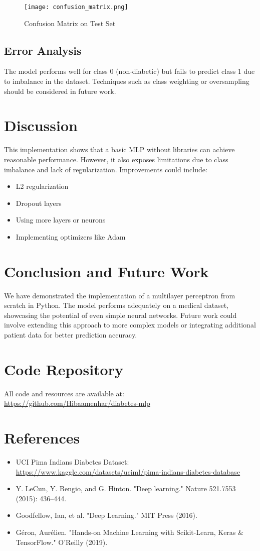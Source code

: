 \documentclass[12pt]{article}
\begin{document}
\begin{figure}[H]
\centering
\texttt{[image: confusion\_matrix.png]}
\caption{Confusion Matrix on Test Set}
\end{figure}

\subsection{Error Analysis}
The model performs well for class 0 (non-diabetic) but fails to predict class 1 due to imbalance in the dataset. Techniques such as class weighting or oversampling should be considered in future work.

\section{Discussion}
This implementation shows that a basic MLP without libraries can achieve reasonable performance. However, it also exposes limitations due to class imbalance and lack of regularization. Improvements could include:
\begin{itemize}
    \item L2 regularization
    \item Dropout layers
    \item Using more layers or neurons
    \item Implementing optimizers like Adam
\end{itemize}

\section{Conclusion and Future Work}
We have demonstrated the implementation of a multilayer perceptron from scratch in Python. The model performs adequately on a medical dataset, showcasing the potential of even simple neural networks. Future work could involve extending this approach to more complex models or integrating additional patient data for better prediction accuracy.

\section*{Code Repository}
All code and resources are available at: \url{https://github.com/Hibaamenhar/diabetes-mlp}

\section*{References}
\begin{itemize}
    \item UCI Pima Indians Diabetes Dataset: \url{https://www.kaggle.com/datasets/uciml/pima-indians-diabetes-database}
    \item Y. LeCun, Y. Bengio, and G. Hinton. "Deep learning." Nature 521.7553 (2015): 436–444.
    \item Goodfellow, Ian, et al. "Deep Learning." MIT Press (2016).
    \item Géron, Aurélien. "Hands-on Machine Learning with Scikit-Learn, Keras & TensorFlow." O’Reilly (2019).
\end{itemize}
\end{document}
